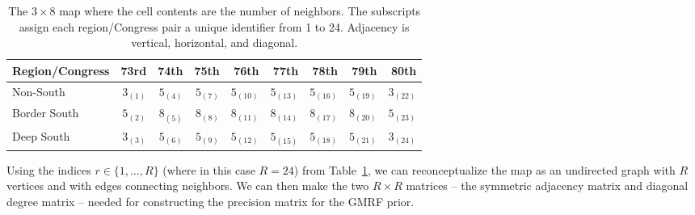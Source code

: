 \begin{table}[ht]
\centering
\begin{tabular}{l|rrrrrrrr}
\textbf{Region}/\textbf{Congress} & 73rd & 74th & 75th & 76th & 77th & 78th & 79th & 80th \\ 
 \toprule
Non-South 	
& $3_{(1)}$ & $5_{(4)}$ & $5_{(7)}$ & $5_{(10)}$ & $5_{(13)}$ & $5_{(16)}$ & $5_{(19)}$ & $3_{(22)}$ \\ 
Border South 	
& $5_{(2)}$ & $8_{(5)}$ & $8_{(8)}$ & $8_{(11)}$ & $8_{(14)}$ & $8_{(17)}$ & $8_{(20)}$ & $5_{(23)}$ \\ 
Deep South 	
& $3_{(3)}$ & $5_{(6)}$ & $5_{(9)}$ & $5_{(12)}$ & $5_{(15)}$ & $5_{(18)}$ & $5_{(21)}$ & $3_{(24)}$ \\ 
   \bottomrule
\end{tabular}
\caption{\small The $3 \times 8$ map where the cell contents are the number of neighbors. The subscripts assign each region/Congress pair a unique identifier from 1 to 24. Adjacency is vertical, horizontal, and diagonal.}
\label{table:map_degree}
\end{table}


Using the indices $r \in \{1,\dots, R\}$ (where in this case $R = 24$) from Table~\ref{table:map_degree}, we can 
reconceptualize the map as an undirected graph with $R$ vertices and with edges connecting neighbors. We can then make the two $R \times R$ matrices -- the symmetric adjacency matrix and diagonal degree matrix -- needed for constructing the precision matrix for the GMRF prior. 


%
%
%
%
%
%
% 
%
%
%




